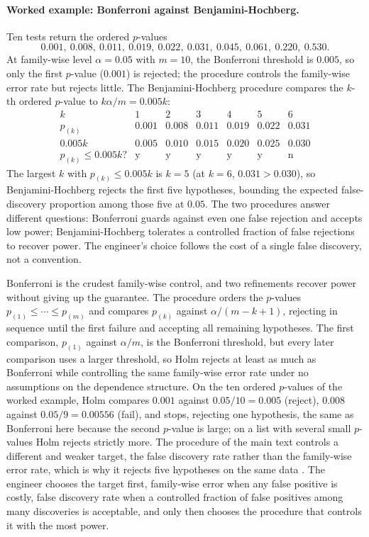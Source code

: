 \paragraph{Worked example: Bonferroni against Benjamini-Hochberg.}
Ten tests return the ordered $p$-values
\[
0.001,\ 0.008,\ 0.011,\ 0.019,\ 0.022,\ 0.031,\ 0.045,\ 0.061,\
0.220,\ 0.530.
\]
At family-wise level $\alpha = 0.05$ with $m = 10$, the Bonferroni
threshold is $0.005$, so only the first $p$-value ($0.001$) is
rejected; the procedure controls the family-wise error rate but
rejects little. The Benjamini-Hochberg procedure compares the
$k$-th ordered $p$-value to $k\alpha/m = 0.005k$:
\[
\begin{array}{c|cccccc}
k & 1 & 2 & 3 & 4 & 5 & 6 \\ \hline
p_{(k)} & 0.001 & 0.008 & 0.011 & 0.019 & 0.022 & 0.031 \\
0.005k & 0.005 & 0.010 & 0.015 & 0.020 & 0.025 & 0.030 \\
p_{(k)} \le 0.005k? & \text{y} & \text{y} & \text{y} & \text{y} & \text{y} & \text{n}
\end{array}
\]
The largest $k$ with $p_{(k)} \leq 0.005k$ is $k = 5$ (at $k = 6$,
$0.031 > 0.030$), so Benjamini-Hochberg rejects the first five
hypotheses, bounding the expected false-discovery proportion among
those five at $0.05$. The two procedures answer different
questions: Bonferroni guards against even one false rejection and
accepts low power; Benjamini-Hochberg tolerates a controlled
fraction of false rejections to recover power. The engineer's
choice follows the cost of a single false discovery, not a
convention.

\begin{mastery}
Bonferroni is the crudest family-wise control, and two refinements
recover power without giving up the guarantee. The \engterm{Holm
step-down} procedure orders the $p$-values $p_{(1)} \leq \cdots \leq
p_{(m)}$ and compares $p_{(k)}$ against $\alpha/(m - k + 1)$,
rejecting in sequence until the first failure and accepting all
remaining hypotheses. The first comparison, $p_{(1)}$ against
$\alpha/m$, is the Bonferroni threshold, but every later comparison
uses a larger threshold, so Holm rejects at least as much as
Bonferroni while controlling the same family-wise error rate under
no assumptions on the dependence structure. On the ten ordered
$p$-values of the worked example, Holm compares $0.001$ against
$0.05/10 = 0.005$ (reject), $0.008$ against $0.05/9 = 0.00556$
(fail), and stops, rejecting one hypothesis, the same as Bonferroni
here because the second $p$-value is large; on a list with several
small $p$-values Holm rejects strictly more. The \engterm{Benjamini-
Hochberg} procedure of the main text controls a different and
weaker target, the false discovery rate rather than the family-wise
error rate, which is why it rejects five hypotheses on the same data
\cite{method:ch08-benjamini-hochberg-1995}. The engineer chooses the
target first, family-wise error when any false positive is costly,
false discovery rate when a controlled fraction of false positives
among many discoveries is acceptable, and only then chooses the
procedure that controls it with the most power.
\end{mastery}

